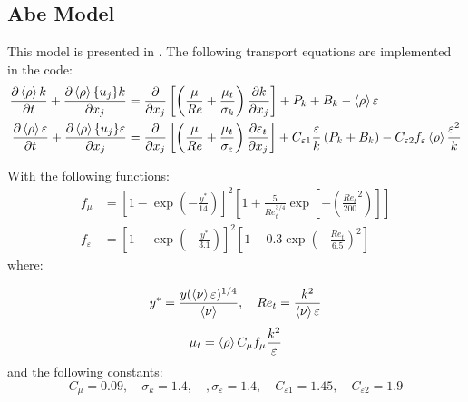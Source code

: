 
\subsection{Abe Model}
This model is presented in \cite{abe1992improved}.
The following transport equations are implemented in the code:
\begin{equation} \label{eq:ktDeng}
\begin{split}
\frac{\partial \left<{\rho}\right> k}{\partial { t}} + \frac{\partial \left<{\rho}\right> \{{u_j}\} k}{\partial {x_j}} &= \frac{\partial}{\partial x_j}\left[\left(\frac{\mu}{Re} + \frac{\mu_t}{\sigma_k}\right)\frac{\partial k}{\partial {x_j}}\right] + P_{k} + B_k- \left<{\rho}\right>\varepsilon \\
\frac{\partial  \left<{\rho}\right> \varepsilon}{\partial {t}} + \frac{\partial  \left<{\rho}\right> \{{u_j}\} \varepsilon}{\partial { x_j}} &= \frac{\partial}{\partial x_j}\left[ \left(\frac{\mu}{Re} + \frac{\mu_t}{\sigma_{\varepsilon}}\right)\frac{\partial  \varepsilon_t}{\partial {x_j}}\right] + C_{\varepsilon1}\frac{\varepsilon}{k}\left(P_k+B_k\right)  -C_{\varepsilon2} f_{\varepsilon}\left<{\rho}\right>\frac{\varepsilon^2}{k}   
\end{split}
\end{equation}

With the following functions:
\begin{equation}
\begin{split}
    f_\mu  &=\left[1-\exp\left(-\frac{y^*}{14}\right)\right]^2\left[1+\frac{5}{Re_t^{3/4}}\exp\left[-\left(\frac{Re_t}{200}^2\right)\right]\right] \\
	f_\varepsilon &= \left[1-\exp\left(-\frac{y^*}{3.1}\right)\right]^2\left[1-0.3\exp\left(-\frac{Re_t}{6.5}\right)^2\right] 
\end{split}
\end{equation}
 where:

 \begin{equation}
y^* = \frac{y(\left<{\nu}\right>\varepsilon)^{1/4}}{\left<{\nu}\right>}, \quad Re_t = \frac{k^2}{\left<{\nu}\right> \varepsilon}
 \end{equation}
\begin{equation}
\mu_t = \left<{\rho}\right> C_\mu f_\mu \frac{k^2}{\varepsilon}
\end{equation}
and the following constants:
\begin{equation}
C_\mu = 0.09, \quad \sigma_k = 1.4, \quad, \sigma_\varepsilon = 1.4, \quad C_{\varepsilon1} = 1.45, \quad C_{\varepsilon2}=1.9
\end{equation}

